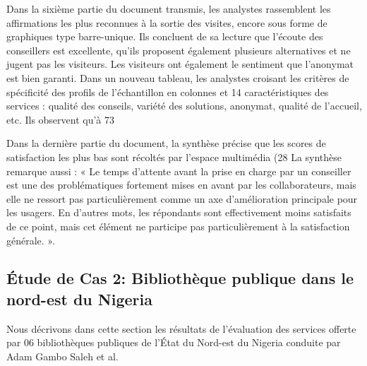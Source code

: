 \documentclass[french,a4paper,12pt]{article}
\begin{document}
\quad Dans la sixième partie du document transmis, les analystes rassemblent les affirmations les plus reconnues à la sortie des visites, encore sous forme de graphiques type barre-unique. Ils concluent de sa lecture que l’écoute des conseillers est excellente, qu’ils proposent également plusieurs alternatives et ne jugent pas les visiteurs. Les visiteurs ont également le sentiment que l’anonymat est bien garanti. Dans un nouveau tableau, les analystes croisant les critères de spécificité des profils de l’échantillon en colonnes et 14 caractéristiques des services : qualité des conseils, variété des solutions, anonymat, qualité de l’accueil, etc. Ils observent qu’à 73%

\quad Dans la dernière partie du document, la synthèse précise que les scores de satisfaction les plus bas sont récoltés par l’espace multimédia (28%
\quad La synthèse remarque aussi : « Le temps d’attente avant la prise en charge par un conseiller est une des problématiques fortement mises en avant par les collaborateurs, mais elle ne ressort pas particulièrement comme un axe d’amélioration principale pour les usagers. En d’autres mots, les répondants sont effectivement moins satisfaits de ce point, mais cet élément ne participe pas particulièrement à la satisfaction générale. ». 



\newpage
\subsection{Étude de Cas 2: Bibliothèque publique dans le nord-est du Nigeria \citep{Saleh}}
\quad Nous décrivons dans cette section les résultats de l'évaluation des services offerte par 06 bibliothèques publiques de l'État du Nord-est du Nigeria conduite par Adam Gambo Saleh et al. \\
\end{document}
